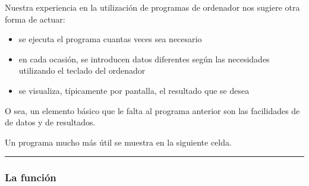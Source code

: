 \documentclass[letterpaper,10pt,english]{sphinxmanual}
\begin{document}
Nuestra experiencia en la utilización de programas de ordenador nos sugiere otra forma de actuar:
\begin{itemize}
\item {} 
se ejecuta el programa cuantas veces sea necesario

\item {} 
en cada ocasión, se introducen datos diferentes según las necesidades utilizando el teclado del ordenador

\item {} 
se visualiza, típicamente por pantalla, el resultado que se desea

\end{itemize}

O sea, un elemento básico que le falta al programa anterior son las facilidades de  de datos y  de resultados.

Un programa mucho más útil se muestra en la siguiente celda.


\bigskip\hrule\bigskip





\subsubsection{La función }
\label{\detokenize{Entrada_salida:la-funcion-print}}
\begin{sphinxVerbatim}[commandchars=\\\{\}]
   

  
  

  
  
    

 
\end{sphinxVerbatim}
\end{document}
